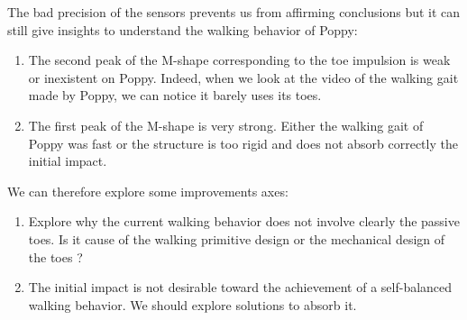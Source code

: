 The bad precision of the sensors prevents us from affirming conclusions but it can still give insights to understand the walking behavior of Poppy:
\begin{enumerate}
    \item The second peak of the M-shape corresponding to the toe impulsion is weak or inexistent on Poppy. Indeed, when we look at the video of the walking gait made by Poppy, we can notice it barely uses its toes.
    \item The first peak of the M-shape is very strong. Either the walking gait of Poppy was fast or the structure is too rigid and does not absorb correctly the initial impact.
\end{enumerate}

We can therefore explore some improvements axes:
\begin{enumerate}
    \item Explore why the current walking behavior does not involve clearly the passive toes. Is it cause of the walking primitive design or the mechanical design of the toes ?
    \item The initial impact is not desirable toward the achievement of a self-balanced walking behavior. We should explore solutions to absorb it.
\end{enumerate}







